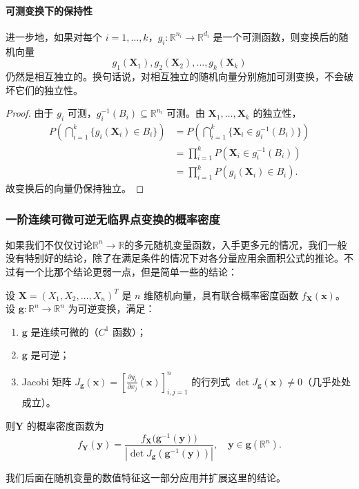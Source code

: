 \paragraph{可测变换下的保持性}
进一步地，如果对每个 \(i = 1, \dots, k\)，\(g_i: \mathbb{R}^{n_i} \to \mathbb{R}^{d_i}\) 是一个可测函数，则变换后的随机向量
\[
g_1(\mathbf{X}_1), g_2(\mathbf{X}_2), \dots, g_k(\mathbf{X}_k)
\]
仍然是相互独立的。换句话说，对相互独立的随机向量分别施加可测变换，不会破坏它们的独立性。

\begin{proof}
由于 \(g_i\) 可测，\(g_i^{-1}(B_i) \subseteq \mathbb{R}^{n_i}\) 可测。由 \(\mathbf{X}_1,\dots,\mathbf{X}_k\) 的独立性，
\begin{align*}
P\left( \bigcap_{i=1}^k \{ g_i(\mathbf{X}_i) \in B_i \} \right)
&=P\left( \bigcap_{i=1}^k \{ \mathbf{X}_i \in g_i^{-1}(B_i) \} \right) \\
&= \prod_{i=1}^k P(\mathbf{X}_i \in g_i^{-1}(B_i)) \\
&= \prod_{i=1}^k P(g_i(\mathbf{X}_i) \in B_i).
\end{align*}
故变换后的向量仍保持独立。
\end{proof}

\subsubsection{一阶连续可微可逆无临界点变换的概率密度}
如果我们不仅仅讨论$\mathbb{R}^n\to\mathbb{R}$的多元随机变量函数，入手更多元的情况，我们一般没有特别好的结论，除了在满足条件的情况下对各分量应用余面积公式的推论。不过有一个比那个结论更弱一点，但是简单一些的结论：

\begin{theorem}
设 $\mathbf{X} = (X_1, X_2, \dots, X_n)^T$ 是 $n$ 维随机向量，具有联合概率密度函数 $f_{\mathbf{X}}(\mathbf{x})$。  
设 $\mathbf{g} : \mathbb{R}^n \to \mathbb{R}^n$ 为可逆变换，满足：
\begin{enumerate}
    \item $\mathbf{g}$ 是连续可微的（$C^1$ 函数）；
    \item $\mathbf{g}$ 是可逆；
    \item Jacobi 矩阵 $J_{\mathbf{g}}(\mathbf{x}) = \left[ \frac{\partial g_i}{\partial x_j}(\mathbf{x}) \right]_{i,j=1}^n$ 的行列式 $\det J_{\mathbf{g}}(\mathbf{x}) \neq 0$（几乎处处成立）。
\end{enumerate}
则$\mathbf{Y}$ 的概率密度函数为
\[
f_{\mathbf{Y}}(\mathbf{y}) = \frac{ f_{\mathbf{X}}\bigl( \mathbf{g}^{-1}(\mathbf{y}) \bigr) }{\left| \det J_{\mathbf{g}}(\mathbf{g}^{-1}(\mathbf{y})) \right|} ,
\quad \mathbf{y} \in \mathbf{g}(\mathbb{R}^n).
\]
\end{theorem}

我们后面在随机变量的数值特征这一部分应用并扩展这里的结论。